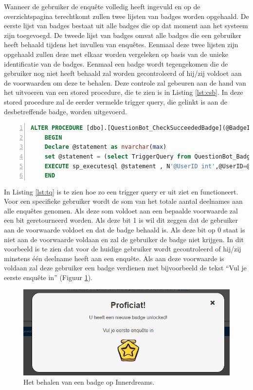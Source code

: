 Wanneer de gebruiker de enquête volledig heeft ingevuld en op de overzichtspagina terechtkomt zullen twee lijsten van badges worden opgehaald. De eerste lijst van badges bestaat uit alle badges die op dat moment aan het systeem zijn toegevoegd. De tweede lijst van badges omvat alle badges die een gebruiker heeft behaald tijdens het invullen van enquêtes. Eenmaal deze twee lijsten zijn opgehaald zullen deze met elkaar worden vergeleken op basis van de unieke identificatie van de badges. Eenmaal een badge wordt tegengekomen die de gebruiker nog niet heeft behaald zal worden gecontroleerd of hij/zij voldoet aan de voorwaarden om deze te behalen. Deze controle zal gebeuren aan de hand van het uitvoeren van een stored procedure, die te zien is in Listing \ref{lst:csb}. In deze stored procedure zal de eerder vermelde trigger query, die gelinkt is aan de desbetreffende badge, worden uitgevoerd.

\begin{lstlisting}[caption={De CheckSucceededBadge stored procedure.},
    label={lst:csb},
    language=SQL,
    showspaces=false,
    basicstyle=\ttfamily,
    numbers=left,
    numberstyle=\tiny,
    numbersep=1pt,
    breaklines=true
    commentstyle=\color{gray}]
    ALTER PROCEDURE [dbo].[QuestionBot_CheckSucceededBadge](@BadgeID int, @UserID int) as
    BEGIN
    Declare @statement as nvarchar(max) 
    set @statement = (select TriggerQuery from QuestionBot_Badge where ID = @BadgeID) 
    EXECUTE sp_executesql @statement , N'@UserID int',@UserID=@UserID
    END
\end{lstlisting}

In Listing \ref{lst:tq} is te zien hoe zo een trigger query er uit ziet en functioneert. Voor een specifieke gebruiker wordt de som van het totale aantal deelnames aan alle enquêtes genomen. Als deze som voldoet aan een bepaalde voorwaarde zal een bit geretourneerd worden. Als deze bit 1 is wil dit zeggen dat de gebruiker aan de voorwaarde voldoet en dat de badge behaald is. Als deze bit op 0 staat is niet aan de voorwaarde voldaan en zal de gebruiker de badge niet krijgen. In dit voorbeeld is te zien dat voor de huidige gebruiker wordt gecontroleerd of hij/zij minstens één deelname heeft aan een enquête. Als aan deze voorwaarde is voldaan zal deze gebruiker een badge verdienen met bijvoorbeeld de tekst ``Vul je eerste enquête in'' (Figuur \ref{fig:badgeunlocked}).

\begin{figure}
    \includegraphics[width=\linewidth]{BadgeUnlocked.png}
    \caption{Het behalen van een badge op Innerdreams.}
    \label{fig:badgeunlocked}
\end{figure}

